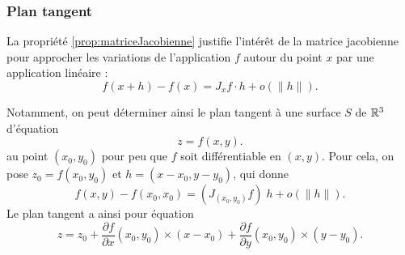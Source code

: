 
\subsubsection*{Plan tangent}

La propriété \ref{prop:matriceJacobienne} justifie l'intérêt de la matrice jacobienne pour approcher les variations de l'application $f$ autour du point $x$ par une application linéaire : 
$$
f(x+h) - f(x) = J_xf \cdot h + o(\|h\|).
$$

Notamment, on peut déterminer ainsi le plan tangent à une surface $S$ de $\mathbb{R}^3$ d'équation
$$
z = f(x, y).
$$
au point $(x_0, y_0)$ pour peu que $f$ soit différentiable en $(x, y)$. Pour cela, on pose $z_0 = f(x_0, y_0)$ et $h = (x-x_0, y-y_0)$, qui donne
$$
f(x, y) - f(x_0, x_0) = \left(J_{(x_0, y_0)} f\right) \; h + o(\|h\|).
$$
Le plan tangent a ainsi pour équation
$$
z = z_0 + \frac{\partial f}{\partial x}(x_0, y_0) \times (x-x_0) + \frac{\partial f}{\partial y}(x_0, y_0) \times (y-y_0).
$$


